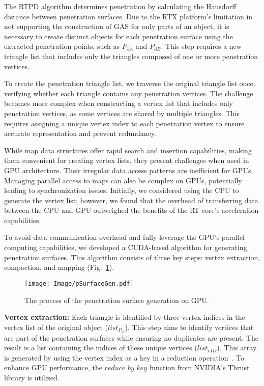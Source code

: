 The RTPD algorithm determines penetration by calculating the Hausdorff distance between penetration surfaces.
Due to the RTX platform's limitation in not supporting the construction of GAS for only parts of an object, it is necessary to create distinct objects for each penetration surface using the extracted penetration points, such as $P_{\partial A}$ and $P_{\partial B}$.
This step requires a new triangle list that includes only the triangles composed of one or more penetration vertices..

To create the penetration triangle list, we traverse the original triangle list once, verifying whether each triangle contains any penetration vertices.
The challenge becomes more complex when constructing a vertex list that includes only penetration vertices, as some vertices are shared by multiple triangles.
This requires assigning a unique vertex index to each penetration vertex to ensure accurate representation and prevent redundancy.

While map data structures offer rapid search and insertion capabilities, making them convenient for creating vertex lists, they present challenges when used in GPU architecture.
Their irregular data access patterns are inefficient for GPUs.
Managing parallel access to maps can also be complex on GPUs, potentially leading to synchronization issues.
Initially, we considered using the CPU to generate the vertex list; however, we found that the overhead of transferring data between the CPU and GPU outweighed the benefits of the RT-core's acceleration capabilities.

To avoid data communication overhead and fully leverage the GPU's parallel computing capabilities, we developed a CUDA-based algorithm for generating penetration surfaces.
This algorithm consists of three key steps: vertex extraction, compaction, and mapping (Fig.~\ref{fig:surfacegen}).

\begin{figure}[t]
    \centering
    \texttt{[image: Image/pSurfaceGen.pdf]}
    \caption{The process of the penetration surface generation on GPU.}
    \label{fig:surfacegen}
\end{figure}

\textbf{Vertex extraction:}
Each triangle is identified by three vertex indices in the vertex list of the original object ($list_{P_O}$).
This step aims to identify vertices that are part of the penetration surfaces while ensuring no duplicates are present.
The result is a list containing the indices of these unique vertices ($list_{vID}$).
This array is generated by using the vertex index as a key in a reduction operation~\cite{roger2007efficient}.
To enhance GPU performance, the $reduce\_by\_key$ function from NVIDIA's Thrust library is utilized.

